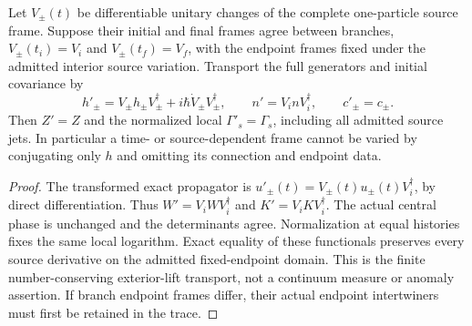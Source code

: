 \documentclass[12pt,a4paper]{article}
\begin{document}
\begin{proposition}
\label{p3f:prop:v247-car-influence-frame-transport}
Let $V_\pm(t)$ be differentiable unitary changes of the complete
one-particle source frame. Suppose their initial and final frames agree
between branches, $V_\pm(t_i)=V_i$ and $V_\pm(t_f)=V_f$, with the
endpoint frames fixed under the admitted interior source variation.
Transport the full generators and initial covariance by
\[
 h'_\pm=V_\pm h_\pm V_\pm^\dagger
                  +i\hbar\dot V_\pm V_\pm^\dagger,
 \qquad n'=V_i nV_i^\dagger,
 \qquad c'_\pm=c_\pm.
\]
Then $Z'=Z$ and the normalized local $\Gamma'_s=\Gamma_s$, including
all admitted source jets. In particular a time- or source-dependent
frame cannot be varied by conjugating only $h$ and omitting its
connection and endpoint data.
\end{proposition}
\begin{proof}
The transformed exact propagator is
$u'_\pm(t)=V_\pm(t)u_\pm(t)V_i^\dagger$, by direct differentiation.
Thus $W'=V_iWV_i^\dagger$ and
$K'=V_iKV_i^\dagger$. The actual central phase is unchanged and the
determinants agree. Normalization at equal histories fixes the same
local logarithm. Exact equality of these functionals preserves every
source derivative on the admitted fixed-endpoint domain. This is the
finite number-conserving exterior-lift transport, not a continuum
measure or anomaly assertion. If branch endpoint frames differ, their
actual endpoint intertwiners must first be retained in the trace.
\end{proof}
\end{document}
